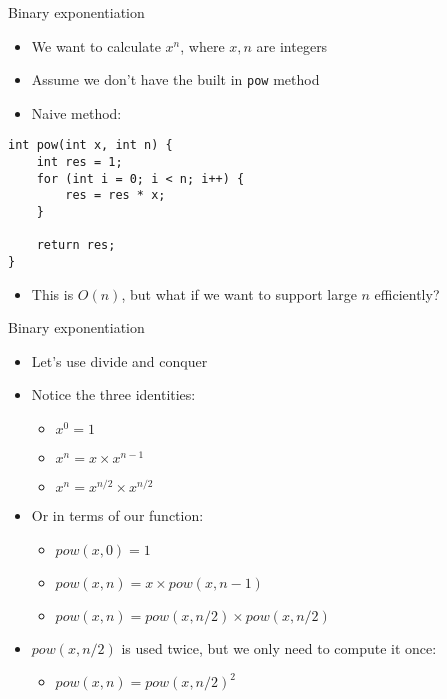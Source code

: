 \documentclass[12pt,t]{beamer}
\newcommand{\bi}{\begin{itemize}}
\newcommand{\ei}{\end{itemize}}
\begin{document}
\begin{frame}[fragile]{Binary exponentiation}
    \bi
        \item We want to calculate $x^n$, where $x,n$ are integers
        \item Assume we don't have the built in \texttt{pow} method
        \item Naive method:
    \ei

    \begin{verbatim}
int pow(int x, int n) {
    int res = 1;
    for (int i = 0; i < n; i++) {
        res = res * x;
    }

    return res;
}
    \end{verbatim}

    \bi
        \item This is $O(n)$, but what if we want to support large $n$ efficiently?
    \ei
\end{frame}

\begin{frame}{Binary exponentiation}
    \bi
        \item Let's use divide and conquer
        \vspace{10pt}
        \item Notice the three identities:

            \bi
                \item $x^0 = 1$
                \item $x^n = x \times x^{n-1}$
                \item $x^n = x^{n/2} \times x^{n/2}$
            \ei

        \item Or in terms of our function:

            \bi
                \item $pow(x,0) = 1$
                \item $pow(x,n) = x \times pow(x, n-1)$
                \item $pow(x,n) = pow(x, n/2) \times pow(x, n/2)$
            \ei

        \item $pow(x,n/2)$ is used twice, but we only need to compute it once:

            \bi
                \item $pow(x,n) = pow(x, n/2)^2$
            \ei
    \ei
\end{frame}
\end{document}
